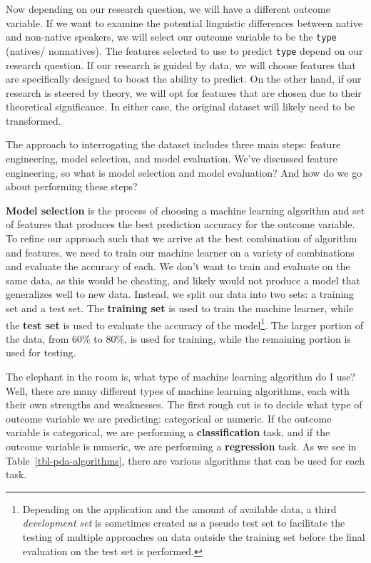 \documentclass[
  letterpaper,
  DIV=11,
  numbers=noendperiod]{scrreport}
\theoremstyle{definition}
\theoremstyle{remark}
\begin{document}
Now depending on our research question, we will have a different outcome
variable. If we want to examine the potential linguistic differences
between native and non-native speakers, we will select our outcome
variable to be the \texttt{type} (natives/ nonnatives). The features
selected to use to predict \texttt{type} depend on our research
question. If our research is guided by data, we will choose features
that are specifically designed to boost the ability to predict. On the
other hand, if our research is steered by theory, we will opt for
features that are chosen due to their theoretical significance. In
either case, the original dataset will likely need to be transformed.

The approach to interrogating the dataset includes three main steps:
feature engineering, model selection, and model evaluation. We've
discussed feature engineering, so what is model selection and model
evaluation? And how do we go about performing these steps?

\textbf{Model selection} is the process of choosing a machine learning
algorithm and set of features that produces the best prediction accuracy
for the outcome variable. To refine our approach such that we arrive at
the best combination of algorithm and features, we need to train our
machine learner on a variety of combinations and evaluate the accuracy
of each. We don't want to train and evaluate on the same data, as this
would be cheating, and likely would not produce a model that generalizes
well to new data. Instead, we split our data into two sets: a training
set and a test set. The \textbf{training set} is used to train the
machine learner, while the \textbf{test set} is used to evaluate the
accuracy of the model\footnote{Depending on the application and the
  amount of available data, a third \emph{development set} is sometimes
  created as a pseudo test set to facilitate the testing of multiple
  approaches on data outside the training set before the final
  evaluation on the test set is performed.}. The larger portion of the
data, from 60\% to 80\%, is used for training, while the remaining
portion is used for testing.

The elephant in the room is, what type of machine learning algorithm do
I use? Well, there are many different types of machine learning
algorithms, each with their own strengths and weaknesses. The first
rough cut is to decide what type of outcome variable we are predicting:
categorical or numeric. If the outcome variable is categorical, we are
performing a \textbf{classification} task, and if the outcome variable
is numeric, we are performing a \textbf{regression} task. As we see in
Table~\ref{tbl-pda-algorithms}, there are various algorithms that can be
used for each task.
\end{document}
